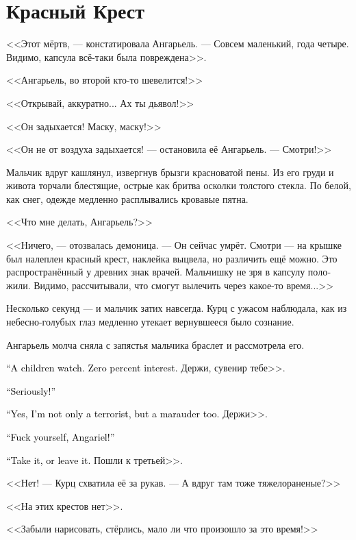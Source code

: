 \documentclass[a4paper,12pt,fleqn]{book}\usepackage{cooltooltips}\usepackage{polyglossia}\setdefaultlanguage[babelshorthands=true]{russian}\setotherlanguage{english}\defaultfontfeatures{Ligatures=TeX,Mapping=tex-text} \usepackage{xcolor}\definecolor{lightgray}{HTML}{bbbbbb}\color{lightgray}\newcommand{\ml}[3]{\textenglish{\textcolor{black}{#3}}}
\begin{document}
\section{Красный Крест}

<<Этот мёртв, --- констатировала Ангарьель.
--- Совсем маленький, года четыре.
Видимо, капсула всё-таки была повреждена>>.

<<Ангарьель, во второй кто-то шевелится!>>

<<Открывай, аккуратно... Ах ты дьявол!>>

<<Он задыхается!
Маску, маску!>>

<<Он не от воздуха задыхается! --- остановила её Ангарьель.
--- Смотри!>>

Мальчик вдруг кашлянул, извергнув брызги красноватой пены.
Из его груди и живота торчали блестящие, острые как бритва осколки толстого стекла.
По белой, как снег, одежде медленно расплывались кровавые пятна.

<<Что мне делать, Ангарьель?>>

<<Ничего, --- отозвалась демоница.
--- Он сейчас умрёт.
Смотри --- на крышке был налеплен красный крест, наклейка выцвела, но различить ещё можно.
Это распространённый у древних знак врачей.
Мальчишку не зря в капсулу положили.
Видимо, рассчитывали, что смогут вылечить через какое-то время...>>

Несколько секунд --- и мальчик затих навсегда.
Курц с ужасом наблюдала, как из небесно-голубых глаз медленно утекает вернувшееся было сознание.

Ангарьель молча сняла с запястья мальчика браслет и рассмотрела его.

\ml{$0$}
{<<Детские часики.}
{``A children watch.}
\ml{$0$}
{Ничего интересного.}
{Zero percent interest.}
Держи, сувенир тебе>>.

\ml{$0$}
{<<Ты серьёзно?!>>}
{``Seriously!''}

\ml{$0$}
{<<Да, я не только террористка, но ещё и мародёрка.}
{``Yes, I'm not only a terrorist, but a marauder too.}
Держи>>.

\ml{$0$}
{<<Иди ты к дьяволу, Ангарьель!>>}
{``Fuck yourself, Angariel!''}

\ml{$0$}
{<<Не хочешь --- не надо.}
{``Take it, or leave it.}
Пошли к третьей>>.

<<Нет! --- Курц схватила её за рукав.
--- А вдруг там тоже тяжелораненые?>>

<<На этих крестов нет>>.

<<Забыли нарисовать, стёрлись, мало ли что произошло за это время!>>
\end{document}
